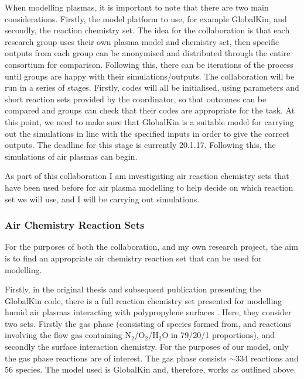 \documentclass[11pt, oneside]{article}   	%
\begin{document}
When modelling plasmas, it is important to note that there are two main considerations.
Firstly, the model platform to use, for example GlobalKin, and secondly, the reaction chemistry set.
The idea for the collaboration is that each research group uses their own plasma model and chemistry set, then specific outputs from each group can be anonymised and distributed through the entire consortium for comparison.
Following this, there can be iterations of the process until groups are happy with their simulations/outputs.
The collaboration will be run in a series of stages.
Firstly, codes will all be initialised, using parameters and short reaction sets provided by the coordinator, so that outcomes can be compared and groups can check that their codes are appropriate for the task.
At this point, we need to make sure that GlobalKin is a suitable model for carrying out the simulations in line with the specified inputs in order to give the correct outputs.
The deadline for this stage is currently 20.1.17.
Following this, the simulations of air plasmas can begin.

As part of this collaboration I am investigating air reaction chemistry sets that have been used before for air plasma modelling to help decide on which reaction set we will use, and I will be carrying out simulations.


\subsubsection{Air Chemistry Reaction Sets}
For the purposes of both the collaboration, and my own research project, the aim is to find an appropriate air chemistry reaction set that can be used for modelling.

Firstly, in the original thesis and subsequent publication presenting the GlobalKin code, there is a full reaction chemistry set presented for modelling humid air plasmas interacting with polypropylene surfaces \cite{Dorai2002modeling, Dorai2003a}.
Here, they consider two sets.
Firstly the gas phase (consisting of species formed from, and reactions involving the flow gas containing N$_2$/O$_2$/H$_2$O in 79/20/1 proportions), and secondly the surface interaction chemistry. 
For the purposes of our model, only the gas phase reactions are of interest.
The gas phase consists $\sim$334 reactions and 56 species. 
The model used is GlobalKin and, therefore, works as outlined above.
\end{document}
